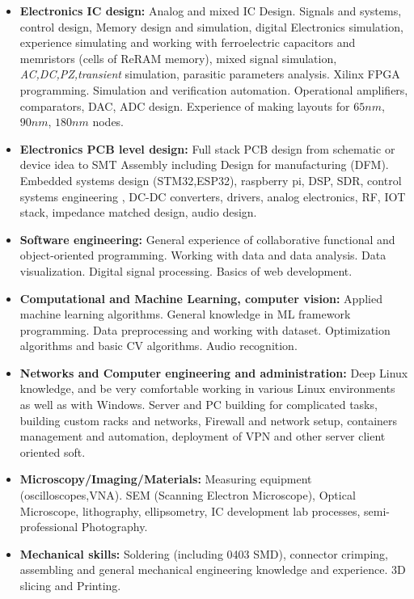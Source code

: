 \documentclass{article}
\begin{document}
\begin{itemize}

\item \textbf{Electronics IC design:} Analog and mixed IC Design. Signals and systems, control design, Memory design and simulation, digital Electronics simulation, experience simulating and working with ferroelectric capacitors and memristors (cells of ReRAM memory), mixed signal simulation, \textit{AC,DC,PZ,transient} simulation, parasitic parameters analysis. Xilinx FPGA programming. Simulation and verification automation. Operational amplifiers, comparators, DAC, ADC design. Experience of making layouts for $65 nm$, $90nm$, $180nm$ nodes.
\item \textbf{Electronics PCB level design:} Full stack PCB design from schematic or device idea to SMT Assembly including Design for manufacturing (DFM). Embedded systems design (STM32,ESP32), raspberry pi, DSP, SDR,  control systems engineering , DC-DC converters, drivers, analog electronics, RF, IOT stack, impedance matched design, audio design.
\item \textbf{Software engineering:} General experience of collaborative functional and object-oriented programming. Working with data and data analysis. Data visualization. Digital signal processing. Basics of web development.
\item \textbf{Computational and Machine Learning, computer vision:} Applied machine learning algorithms. General knowledge in ML framework programming. Data preprocessing and working with dataset. Optimization algorithms and basic CV algorithms. Audio recognition.
\item \textbf{Networks and Computer engineering and administration:} Deep Linux knowledge, and be very comfortable working in various Linux environments as well as with Windows. Server and PC building for complicated tasks, building custom racks and networks, Firewall and network setup, containers management and automation, deployment of VPN and other server client oriented soft.
\item \textbf{Microscopy/Imaging/Materials:} Measuring equipment (oscilloscopes,VNA). SEM (Scanning Electron Microscope), Optical Microscope, lithography, ellipsometry, IC development lab processes, semi-professional Photography.
\item \textbf{Mechanical skills:} Soldering (including 0403 SMD), connector crimping,  assembling and general mechanical engineering knowledge and experience. 3D slicing and Printing.
\end{itemize}
 
\end{document}
